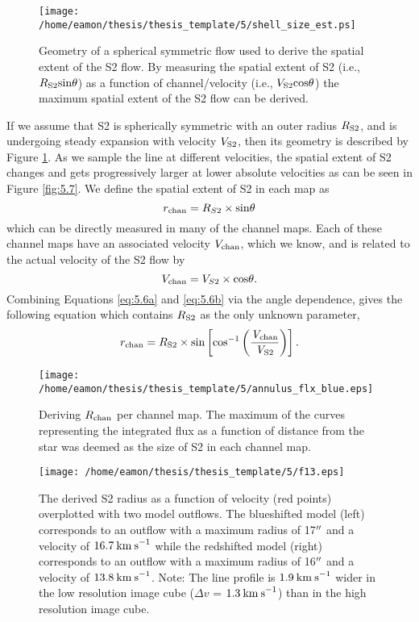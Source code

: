 \begin{figure}[!ht]
\centering 
\texttt{[image: /home/eamon/thesis/thesis\_template/5/shell\_size\_est.ps]}
\caption[Geometry of a spherical symmetric flow.]{Geometry of a spherical symmetric flow used to derive the spatial extent of the S2 flow. By measuring the spatial extent of S2 (i.e., $R_{\rm{S2}}\rm{sin}\theta$) as a function of channel/velocity (i.e., $V_{\rm{S2}}\rm{cos}\theta$) the maximum spatial extent of the S2 flow can be derived.}
\label{fig:5.8}
\end{figure}

If we assume that S2 is spherically symmetric with an outer radius $R_{\rm{S2}}$, and is undergoing steady expansion with velocity $V_{\rm{S2}}$, then its geometry is described by Figure \ref{fig:5.8}. As we sample the line at different velocities, the spatial extent of S2 changes and gets progressively larger at lower absolute velocities as can be seen in Figure \ref{fig:5.7}. We define the spatial extent of S2 in each map as
\begin{equation}
r_{\rm{chan}}=R_{S2}\times \rm{sin}\mathrm{\theta}
\label{eq:5.6a}
\end{equation}
which can be directly measured in many of the channel maps. Each of these channel maps have an associated velocity $V_{\rm{chan}}$, which we know, and is related to the actual velocity of the S2 flow by
\begin{equation}
V_{\rm{chan}}=V_{S2}\times \rm{cos}\mathrm{\theta}.
\label{eq:5.6b}
\end{equation}
Combining Equations \ref{eq:5.6a} and \ref{eq:5.6b} via the angle dependence, gives the following equation which contains $R_{\rm{S2}}$ as the only unknown parameter,
\begin{equation}
r_{\rm{chan}}= R_{\rm{S2}}\times \rm{sin}\left[\rm{cos}^{-1}\left(\frac{\mathit{V}_{chan}}{\mathit{V}_{S2}}\right) \right].
\label{eq:5.6c}
\end{equation} 

\begin{figure}
\centering 
\texttt{[image: /home/eamon/thesis/thesis\_template/5/annulus\_flx\_blue.eps]}
\caption[Deriving $R_{\rm{chan}}$ per channel map]{Deriving $R_{\rm{chan}}$ per channel map. The maximum of the curves representing the integrated flux as a function of distance from the star was deemed as the size of S2 in each channel map.}
\label{fig:5.9}
\centering 
\texttt{[image: /home/eamon/thesis/thesis\_template/5/f13.eps]}
\caption[S2 radius as a function of channel velocity]{The derived S2 radius as a function of velocity (red points) overplotted with two model outflows. The blueshifted model (left) corresponds to an outflow with a maximum radius of 17$^{\prime\prime}$ and a velocity of $16.7\>{\rm km\>s}^{-1}$ while the redshifted model (right) corresponds to an outflow with a maximum radius of 16$^{\prime\prime}$ and a velocity of $13.8\>{\rm km\>s}^{-1}$. Note: The line profile is $1.9\>{\rm km\>s}^{-1}$ wider in the low resolution image cube ($\Delta v$ = $1.3\>{\rm km\>s}^{-1}$) than in the high resolution image cube.}
\label{fig:5.10}
\end{figure}

